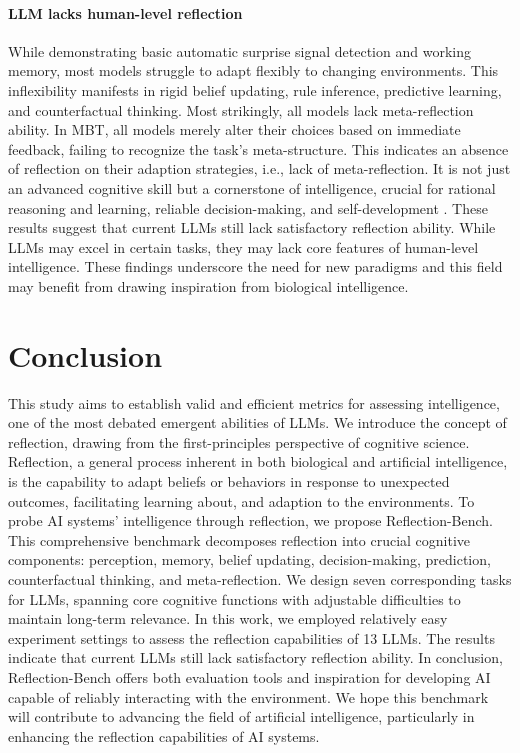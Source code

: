 \paragraph{LLM lacks human-level reflection} While demonstrating basic automatic surprise signal detection and working memory, most models struggle to adapt flexibly to changing environments. This inflexibility manifests in rigid belief updating, rule inference, predictive learning, and counterfactual thinking. Most strikingly, all models lack meta-reflection ability. In MBT, all models merely alter their choices based on immediate feedback, failing to recognize the task's meta-structure. This indicates an absence of reflection on their adaption strategies, i.e., lack of meta-reflection. It is not just an advanced cognitive skill but a cornerstone of intelligence, crucial for rational reasoning and learning, reliable decision-making, and self-development \cite{GRIFFITHS2020873,BOUREAU2015700,li2024enabling}. These results suggest that current LLMs still lack satisfactory reflection ability. While LLMs may excel in certain tasks, they may lack core features of human-level intelligence. These findings underscore the need for new paradigms and this field may benefit from drawing inspiration from biological intelligence.

\section{Conclusion}
This study aims to establish valid and efficient metrics for assessing intelligence, one of the most debated emergent abilities of LLMs. We introduce the concept of reflection, drawing from the first-principles perspective of cognitive science. Reflection, a general process inherent in both biological and artificial intelligence, is the capability to adapt beliefs or behaviors in response to unexpected outcomes, facilitating learning about, and adaption to the environments. To probe AI systems' intelligence through reflection, we propose Reflection-Bench. This comprehensive benchmark decomposes reflection into crucial cognitive components: perception, memory, belief updating, decision-making, prediction, counterfactual thinking, and meta-reflection. We design seven corresponding tasks for LLMs, spanning core cognitive functions with adjustable difficulties to maintain long-term relevance. In this work, we employed relatively easy experiment settings to assess the reflection capabilities of 13 LLMs. The results indicate that current LLMs still lack satisfactory reflection ability. In conclusion, Reflection-Bench offers both evaluation tools and inspiration for developing AI capable of reliably interacting with the environment. We hope this benchmark will contribute to advancing the field of artificial intelligence, particularly in enhancing the reflection capabilities of AI systems.

